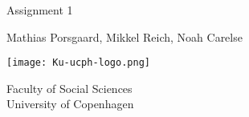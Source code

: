 \begin{titlepage}
    \begin{center}
        \vspace*{1cm}
            
        \Huge
        Assignment 1

            
        \vspace{-1.0cm}
        \LARGE
        
            
        \vspace{1.5cm}
            
        Mathias Porsgaard, Mikkel Reich, Noah Carelse
            
        \vfill
            
        \vspace{0.8cm}
            
        \texttt{[image: Ku-ucph-logo.png]}
            
        \Large
        Faculty of Social Sciences\\
        University of Copenhagen
            
    \end{center}
\end{titlepage}